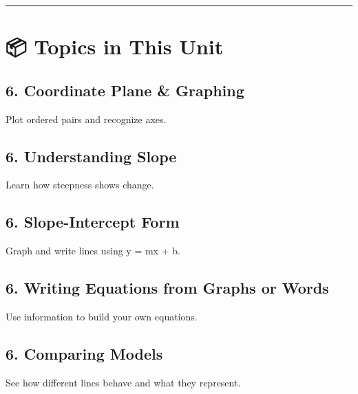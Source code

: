 \documentclass[
  letterpaper,
]{scrrept}
\begin{document}
\begin{center}\rule{0.5\linewidth}{0.5pt}\end{center}

\section*{📦 Topics in This Unit}\label{topics-in-this-unit-4}


\subsection*{6. Coordinate Plane \&
Graphing}\label{coordinate-plane-graphing}

Plot ordered pairs and recognize axes.

\subsection*{6. Understanding Slope}\label{understanding-slope}

Learn how steepness shows change.

\subsection*{6. Slope-Intercept Form}\label{slope-intercept-form}

Graph and write lines using y = mx + b.

\subsection*{6. Writing Equations from Graphs or
Words}\label{writing-equations-from-graphs-or-words}

Use information to build your own equations.

\subsection*{6. Comparing Models}\label{comparing-models}

See how different lines behave and what they represent.
\end{document}
